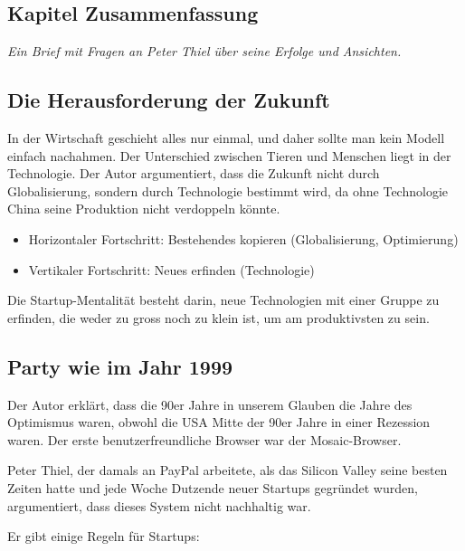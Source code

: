 \documentclass[10pt]{article}
\begin{document}
\clearpage


\begin{center}
\section*{Kapitel Zusammenfassung}
\textit{Ein Brief mit Fragen an Peter Thiel über seine Erfolge und Ansichten.}
\end{center}

\subsection{Die Herausforderung der Zukunft}

In der Wirtschaft geschieht alles nur einmal, und daher sollte man kein Modell einfach nachahmen. Der Unterschied zwischen Tieren und Menschen liegt in der Technologie. Der Autor argumentiert, dass die Zukunft nicht durch Globalisierung, sondern durch Technologie bestimmt wird, da ohne Technologie China seine Produktion nicht verdoppeln könnte.

\begin{itemize}
\item Horizontaler Fortschritt: Bestehendes kopieren (Globalisierung, Optimierung)
\item Vertikaler Fortschritt: Neues erfinden (Technologie)
\end{itemize}

Die Startup-Mentalität besteht darin, neue Technologien mit einer Gruppe zu erfinden, die weder zu gross noch zu klein ist, um am produktivsten zu sein.

\subsection{Party wie im Jahr 1999}

Der Autor erklärt, dass die 90er Jahre in unserem Glauben die Jahre des Optimismus waren, obwohl die USA Mitte der 90er Jahre in einer Rezession waren. Der erste benutzerfreundliche Browser war der Mosaic-Browser.

Peter Thiel, der damals an PayPal arbeitete, als das Silicon Valley seine besten Zeiten hatte und jede Woche Dutzende neuer Startups gegründet wurden, argumentiert, dass dieses System nicht nachhaltig war.

Er gibt einige Regeln für Startups:
\end{document}
